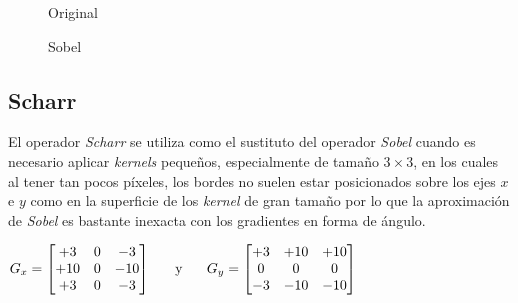\begin{figure}[H]
  \caption{Original}
  \centering \setlength\fboxsep{0pt} \setlength\fboxrule{0.5pt}
\end{figure}

\begin{figure}[H]
  \centering \setlength\fboxsep{0pt} \setlength\fboxrule{0.5pt}
  \caption{Sobel}
\end{figure}

\subsection{Scharr}
El operador \emph{Scharr} se utiliza como el sustituto del operador
\emph{Sobel} cuando es necesario aplicar \emph{kernels} pequeños,
especialmente de tamaño $3 \times 3$, en los cuales al tener tan pocos
píxeles, los bordes no suelen estar posicionados sobre los ejes $x$ e
$y$ como en la superficie de los \emph{kernel} de gran tamaño por lo
que la aproximación de \emph{Sobel} es bastante inexacta con los
gradientes en forma de ángulo.
\begin{center}
  $ G_x = \begin{bmatrix}
    +3 & 0 & -3 \\
    +10 & 0 & -10 \\
    +3 & 0 & -3 \\
  \end{bmatrix}
  \hspace{0.5cm} \text{ y } \hspace{0.5cm} G_y = \begin{bmatrix}
    +3 & +10 & +10 \\
    0 & 0 & 0 \\
    -3 & -10 & -10 \\
  \end{bmatrix}
  $
\end{center}

